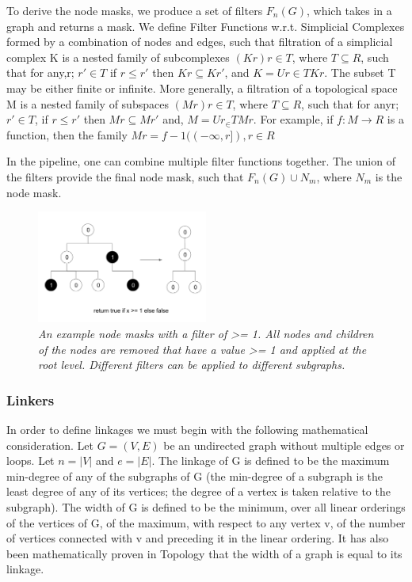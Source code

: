 To derive the node masks, we produce a set of filters $F_{n}(G)$, which takes in a graph and returns a mask. We define Filter Functions  w.r.t. Simplicial Complexes formed by a combination of nodes and edges, such that filtration of a simplicial complex K is a nested family of subcomplexes $(Kr)r \in T$, where $T \subseteq R$, such that for any,r; $r \prime \in T$  if $r \le r \prime$ then $Kr \subseteq Kr\prime$,  and  $K=Ur \in TKr$. The subset T may be either finite or infinite. More generally, a filtration of a topological space M is a nested family of subspaces $(Mr)r \in T$,  where $ T  \subseteq R $, such that for anyr; $r\prime \in T$, if $r \le r\prime$ then $Mr \subseteq Mr\prime$ and, $M=Ur_{\in}TMr$. For example, if $f : M \rightarrow R$ is a function, then the family $Mr = f-1 ((-\infty , r \rbrack), r \in R$ %

In the pipeline, one can combine multiple filter functions together. The union of the filters provide the final node mask, such that $ F_{n}(G) \cup N_{m}$, where $N_{m}$ is the node mask.

\begin{figure}[H]
	\centering
        \includegraphics[width=0.5\textwidth]{images/nodemask.png}
	\caption{\textit{An example node masks with a filter of >= 1. All nodes and children of the nodes are removed that have a value >= 1 and applied at the root level. Different filters can be applied to different subgraphs.}}
	\label{fig:nodemask}
\end{figure}

\subsubsection{Linkers}

In order to define linkages we must begin with the following mathematical consideration. Let $G = (V, E)$ be an undirected graph without multiple edges or loops. Let $n =|V|$ and $e= |E|$. The linkage of G is defined to be the maximum min-degree of any of the subgraphs of G (the min-degree of a subgraph is the least degree of any of its vertices; the degree of a vertex is taken relative to the subgraph). The width of G is defined to be the minimum, over all linear orderings of the vertices of G, of the maximum, with respect to any vertex v, of the number of vertices connected with v and preceding it in the linear ordering. It has also been mathematically proven in Topology that the width of a graph is equal to its linkage.

